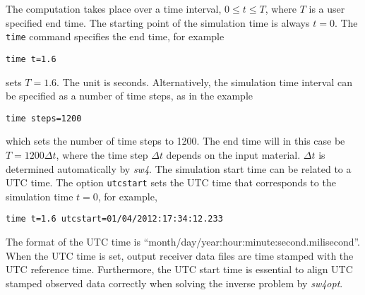 \documentclass[11pt]{report}
\begin{document}
The computation takes place over a time interval, $0\leq t \leq T$, where $T$ is a user specified end time.
The starting point of the simulation time is always $t=0$. The {\tt time} command specifies the end time, for example
\begin{verbatim}
time t=1.6
\end{verbatim}
sets $T=1.6$. The unit is seconds. Alternatively, the simulation time interval can be specified as 
a number of time steps, as in the example
\begin{verbatim}
time steps=1200
\end{verbatim}
which sets the number of time steps to 1200. The end time will in this case be $T=1200\Delta t$, where the
time step $\Delta t$ depends on the input material. $\Delta t$ is determined automatically by \emph{sw4}.
The simulation start time can be related to a UTC time. The option {\tt utcstart} sets the UTC time that
corresponds to the simulation time $t=0$, for example,
\begin{verbatim}
time t=1.6 utcstart=01/04/2012:17:34:12.233
\end{verbatim}
The format of the UTC time is ``month/day/year:hour:minute:second.milisecond''. When the UTC time is set,
output receiver data files are time stamped with the UTC reference time. Furthermore, the UTC start time
is essential to align UTC stamped observed data correctly when solving the inverse problem by \emph{sw4opt}.
\end{document}
